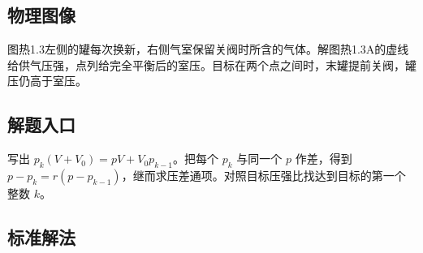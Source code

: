 \documentclass[UTF8,fontset=fandol,a4paper,11pt]{ctexart}
\begin{document}


\subsection*{物理图像}

图热1.3左侧的罐每次换新，右侧气室保留关阀时所含的气体。解图热1.3A的虚线给供气压强，点列给完全平衡后的室压。目标在两个点之间时，末罐提前关阀，罐压仍高于室压。



\subsection*{解题入口}

写出 $p_k(V+V_0)=pV+V_0p_{k-1}$。把每个 $p_k$ 与同一个 $p$ 作差，得到 $p-p_k=r(p-p_{k-1})$，继而求压差通项。对照目标压强比找达到目标的第一个整数 $k$。



\subsection*{标准解法}
\end{document}
